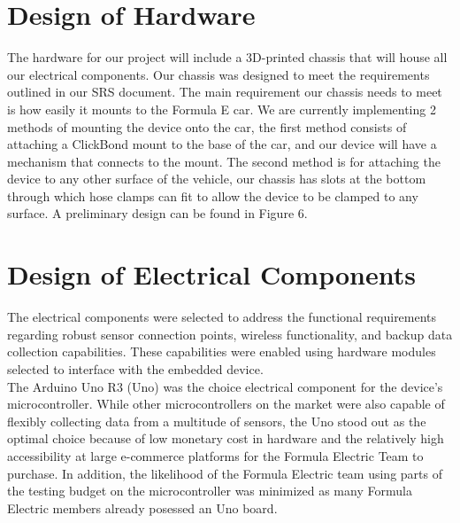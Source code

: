 \documentclass[12pt, titlepage]{article}
\begin{document}
\section{Design of Hardware}

The hardware for our project will include a 3D-printed chassis that will house all our electrical components. Our chassis was designed to meet the requirements outlined in our SRS document. The main requirement our chassis needs to meet is how easily it mounts to the Formula E car. We are currently implementing 2 methods of mounting the device onto the car, the first method consists of attaching a ClickBond mount to the base of the car, and our device will have a mechanism that connects to the mount. The second method is for attaching the device to any other surface of the vehicle, our chassis has slots at the bottom through which hose clamps can fit to allow the device to be clamped to any surface. A preliminary design can be found in Figure 6.


\newpage
\section{Design of Electrical Components}


The electrical components were selected to address the functional requirements regarding robust sensor connection points, wireless functionality, and backup data collection capabilities. These capabilities were enabled using hardware modules selected to interface with the embedded device. \\

The Arduino Uno R3 (Uno) was the choice electrical component for the device's microcontroller. While other microcontrollers on the market were also capable of flexibly collecting data from a multitude of sensors, the Uno stood out as the optimal choice because of low monetary cost in hardware and the relatively high accessibility at large e-commerce platforms for the Formula Electric Team to purchase. In addition, the likelihood of the Formula Electric team using parts of the testing budget on the microcontroller was minimized as many Formula Electric members already posessed an Uno board. \\
\end{document}
